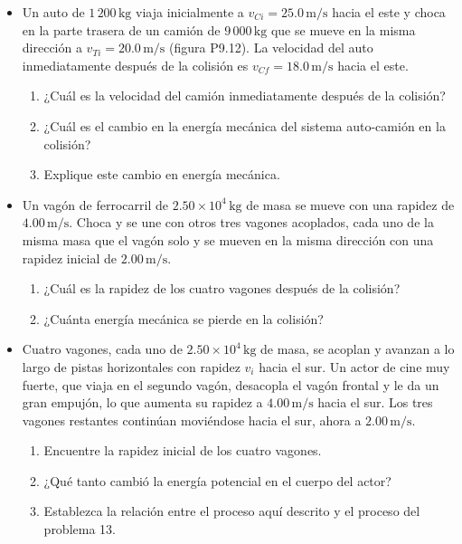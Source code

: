 \documentclass[11pt,a4paper]{article}
\begin{document}
\begin{itemize}
    \item[\textbf{12.}] Un auto de \(1\,200\,\text{kg}\) viaja inicialmente a \(v_{Ci} = 25.0\,\text{m/s}\) hacia el este y choca en la parte trasera de un camión de \(9\,000\,\text{kg}\) que se mueve en la misma dirección a \(v_{Ti} = 20.0\,\text{m/s}\) (figura P9.12). La velocidad del auto inmediatamente después de la colisión es \(v_{Cf} = 18.0\,\text{m/s}\) hacia el este.
    \begin{enumerate}
        \item ¿Cuál es la velocidad del camión inmediatamente después de la colisión?
        \item ¿Cuál es el cambio en la energía mecánica del sistema auto-camión en la colisión?
        \item Explique este cambio en energía mecánica.
    \end{enumerate}
    \vspace*{6cm}

    \item[\textbf{13.}] Un vagón de ferrocarril de \(2.50 \times 10^4\,\text{kg}\) de masa se mueve con una rapidez de \(4.00\,\text{m/s}\). Choca y se une con otros tres vagones acoplados, cada uno de la misma masa que el vagón solo y se mueven en la misma dirección con una rapidez inicial de \(2.00\,\text{m/s}\).
    \begin{enumerate}
        \item ¿Cuál es la rapidez de los cuatro vagones después de la colisión?
        \item ¿Cuánta energía mecánica se pierde en la colisión?
    \end{enumerate}
    \vspace*{6cm}

    \item[\textbf{14.}] Cuatro vagones, cada uno de \(2.50 \times 10^4\,\text{kg}\) de masa, se acoplan y avanzan a lo largo de pistas horizontales con rapidez \(v_i\) hacia el sur. Un actor de cine muy fuerte, que viaja en el segundo vagón, desacopla el vagón frontal y le da un gran empujón, lo que aumenta su rapidez a \(4.00\,\text{m/s}\) hacia el sur. Los tres vagones restantes continúan moviéndose hacia el sur, ahora a \(2.00\,\text{m/s}\).
    \begin{enumerate}
        \item Encuentre la rapidez inicial de los cuatro vagones.
        \item ¿Qué tanto cambió la energía potencial en el cuerpo del actor?
        \item Establezca la relación entre el proceso aquí descrito y el proceso del problema 13.
    \end{enumerate}
    \vspace*{6cm}
\end{itemize}
\end{document}
